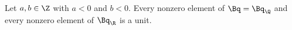Let $a,b\in\Z$ with $a<0$ and $b<0$. Every nonzero element of $\Bq=\Bq_\Q$ and every nonzero element of $\Bq_\R$ is a unit.
